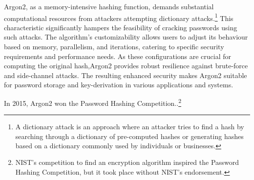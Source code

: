 Argon2, as a memory-intensive hashing function, demands substantial
computational resources from attackers attempting dictionary attacks.\footnote{
  A dictionary attack is an approach where an attacker tries to find a hash by
  searching through a dictionary of pre-computed hashes or generating hashes
  based on a dictionary commonly used by individuals or businesses.
}
This characteristic significantly hampers the feasibility of cracking passwords
using such attacks.
The algorithm's customizability allows users to adjust its behaviour based on
memory, parallelism, and iterations, catering to specific security requirements
and performance needs.
As these configurations are crucial for computing the original hash,Argon2
provides robust resilience against brute-force and side-channel attacks.
The resulting enhanced security makes Argon2 suitable for password storage and
key-derivation in various applications and systems.

In 2015, Argon2 won the Password Hashing Competition.\cite{passwordhashing}.\footnote{
  NIST's competition to find an encryption algorithm inspired the Password
  Hashing Competition, but it took place without NIST's endorsement.
}
